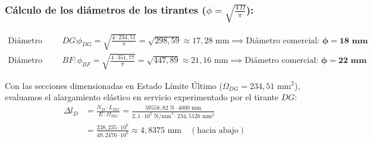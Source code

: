 \subsubsection*{Cálculo de los diámetros de los tirantes ($\phi = \sqrt{\frac{4\,\Omega}{\pi}}$):}
\begin{align}
    \text{Diámetro tirante } DG: & \quad \phi_{DG} = \sqrt{\frac{4 \cdot 234{,}51}{\pi}} = \sqrt{298{,}59} \approx \boxed{17{,}28\text{ mm}} \implies \text{Diámetro comercial: } \mathbf{\phi = 18\text{ mm}} \\[6pt]
    \text{Diámetro tirante } BF: & \quad \phi_{BF} = \sqrt{\frac{4 \cdot 351{,}77}{\pi}} = \sqrt{447{,}89} \approx \boxed{21{,}16\text{ mm}} \implies \text{Diámetro comercial: } \mathbf{\phi = 22\text{ mm}}
\end{align}



Con las secciones dimensionadas en Estado Límite Último ($\Omega_{DG} = 234{,}51\text{ mm}^2$), evaluamos el alargamiento elástico en servicio experimentado por el tirante $DG$:
\begin{align}
    \Delta l_D & = \frac{N_D \cdot L_{DG}}{E \cdot \Omega_{DG}} = \frac{59558{,}82\text{ N} \cdot 4000\text{ mm}}{2{,}1 \cdot 10^5\text{ N/mm}^2 \cdot 234{,}5126\text{ mm}^2} \nonumber \\
               & = \frac{238{,}235 \cdot 10^6}{49{,}2476 \cdot 10^6} \approx \boxed{4{,}8375\text{ mm}} \quad (\text{hacia abajo})
\end{align}

